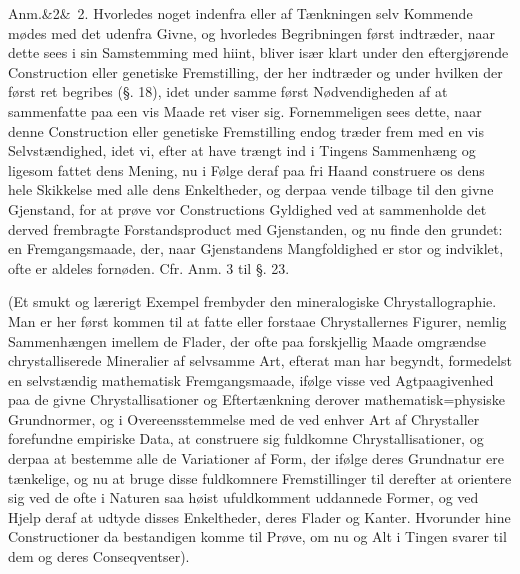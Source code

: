 \documentclass[12pt]{book}
\makeatletter
\def\sperr#1{#1}%
\def\textit#1{#1}%
\def\emph#1{#1}%
\newcommand{\sperr}[1]{\textls[180]{#1}}
\newcommand{\umph}[2][misc]{%
  \@ifundefined{umph@#1@on}{#2}{\emph{#2}}}
\newcommand{\anm}[1]{%
  \par\vspace{0.5\baselineskip}%
  \noindent\hspace{\parindent}\sperr{Anm.}\ifx&#1&\else~\textit{#1}.\fi
  \enspace\ignorespaces
}
\newcommand{\opage}[1]{\marginnote{\footnotesize\textit{[#1]}}}
\makeatother
\begin{document}
\anm{2} Hvorledes noget indenfra eller af Tænkningen selv Kommende mødes med det
udenfra Givne, og hvorledes Begribningen først indtræder, naar dette sees i sin
Samstemming med hiint, bliver især klart under den eftergjørende Construction
eller genetiske Fremstilling, der her indtræder og under hvilken der først ret
begribes (§. 18), idet under samme først Nødvendigheden af at sammenfatte paa
\emph{een vis Maade} ret viser sig. Fornemmeligen sees dette, naar denne
Construction eller genetiske Fremstilling endog træder frem med en vis
Selvstændighed, idet vi, efter at
\opage{110} have trængt ind i Tingens Sammenhæng og ligesom fattet dens Mening, nu i Følge
deraf paa fri Haand construere os dens hele Skikkelse med alle dens Enkeltheder,
og derpaa vende tilbage til den givne Gjenstand, for at prøve vor Constructions
Gyldighed ved at sammenholde det derved frembragte Forstandsproduct med
Gjenstanden, og nu finde den grundet: en Fremgangsmaade, der, naar Gjenstandens
Mangfoldighed er stor og indviklet, ofte er aldeles fornøden. Cfr. Anm. 3 til
§. 23.

(Et smukt og lærerigt Exempel frembyder den mineralogiske Chrystallographie. Man
er her først kommen til at fatte eller forstaae Chrystallernes Figurer, nemlig
Sammenhængen imellem de Flader, der ofte paa forskjellig Maade omgrændse
chrystalliserede Mineralier af selvsamme Art, efterat man har begyndt,
formedelst en selvstændig mathematisk Fremgangsmaade, ifølge visse ved
Agtpaagivenhed paa de givne Chrystallisationer og Eftertænkning derover
\umph[schwab]{abstraherede} mathematisk=physiske Grundnormer, og i Overeensstemmelse med de ved
enhver Art af Chrystaller forefundne empiriske Data, at construere sig
fuldkomne Chrystallisationer, og derpaa at bestemme alle de Variationer af Form,
der ifølge deres Grundnatur ere tænkelige, og nu at bruge disse fuldkomnere
Fremstillinger til derefter at orientere sig ved de ofte i Naturen saa høist
ufuldkomment uddannede Former, og ved Hjelp deraf at udtyde disses Enkeltheder,
deres Flader og Kanter. Hvorunder
\opage{111} hine Constructioner da bestandigen komme til Prøve, om nu og Alt i Tingen svarer
til dem og deres Conseqventser).
\end{document}
